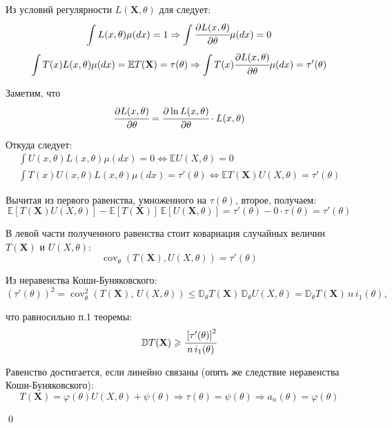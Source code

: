 \documentclass[oneside,final,14pt]{extreport}
\renewenvironment{proof}{{\bfseries Доказательство.}}{\qed}
\theoremstyle{plain}
\theoremstyle{definition}
\theoremstyle{named}
\begin{document}
\begin{proof}
Из условий регулярности $L(\mathbf{X}, \theta)$ для следует:
$$\int L(x, \theta) \mu(d x)=1 \Rightarrow \int \cfrac{\partial L(x, \theta)}{\partial \theta} \mu(d x)=0$$
\begin{equation*}
    \int T(x) L(x, \theta) \mu(d x)=\mathbb{E} T(\mathbf{X})=\tau(\theta) \Rightarrow \int T(x) \cfrac{\partial L(x, \theta)}{\partial \theta} \mu(d x)=\tau'(\theta)
\end{equation*}

Заметим, что
\begin{equation*}
    \cfrac{\partial L(x, \theta)}{\partial \theta}=\cfrac{\partial \ln L(x, \theta)}{\partial \theta} \cdot L(x, \theta)
\end{equation*}

Откуда следует:
\begin{gather*}
    \int U(x, \theta) L(x, \theta) \mu(d x)=0 \Leftrightarrow \mathbb{E} U(X, \theta)=0 \\
\int T(x) U(x, \theta) L(x, \theta) \mu(d x)=\tau'(\theta) \Leftrightarrow \mathbb{E} T(\mathbf{X}) U(X, \theta)=\tau'(\theta)
\end{gather*}

Вычитая из первого равенства, умноженного на $\tau(\theta)$, второе, получаем:
\begin{equation*}
    \mathbb{E}\left[T(\mathbf{X}) U(X, \theta)\right] - \mathbb{E}\left[T(\mathbf{X})\right] \, \mathbb{E}\left[U(\mathbf{X}, \theta)\right] = \tau'(\theta) - 0 \cdot \tau(\theta) = \tau'(\theta)
\end{equation*}

В левой части полученного равенства стоит ковариация случайных величин $T(\mathbf{X})$ и $U(X,\theta)$:
\begin{equation*}
    \operatorname{cov}_{\theta}(T(\mathbf{X}), U(X, \theta))=\tau'(\theta)
\end{equation*}

Из неравенства Коши-Буняковского:
\begin{equation*}
    \left(\tau'(\theta)\right)^{2}=\operatorname{cov}_{\theta}^{2}(T(\mathbf{X}), \, U(X, \theta)) \leqslant \mathbb{D}_{\theta} T(\mathbf{X}) \,\mathbb{D}_{\theta} U(X, \theta)=\mathbb{D}_{\theta} T(\mathbf{X}) \, 
    n \, i_1(\theta),
\end{equation*}

что равносильно п.1 теоремы:
\begin{equation*}
    \mathbb{D} T(\mathbf{X}) \geqslant \cfrac{\left[\tau'(\theta)\right]^{2}}
    {n \, i_1(\theta)}
\end{equation*}

Равенство достигается, если линейно связаны (опять же следствие неравенства Коши-Буняковского):
\begin{equation*}
    T(\mathbf{X})=\varphi(\theta) U(X, \theta)+\psi(\theta) \Rightarrow \tau(\theta)=\psi(\theta) \Rightarrow a_{n}(\theta)=\varphi(\theta)
\end{equation*}

\end{proof}
\end{document}
